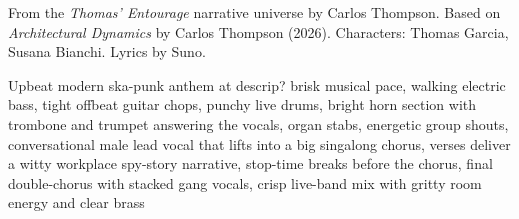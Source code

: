 
\begin{notes}
From the \emph{Thomas’ Entourage} narrative universe by Carlos Thompson. Based on \emph{Architectural Dynamics} by Carlos Thompson (2026). Characters: Thomas Garcia, Susana Bianchi. Lyrics by Suno.
\end{notes}
\begin{style}
Upbeat modern ska-punk anthem at  descrip? brisk  musical pace, walking electric bass, tight offbeat guitar chops, punchy live drums, bright horn section with trombone and trumpet answering the vocals, organ stabs, energetic group shouts, conversational male lead vocal that lifts into a big singalong chorus, verses deliver a witty workplace spy-story narrative, stop-time breaks before the chorus, final double-chorus with stacked gang vocals, crisp live-band mix with gritty room energy and clear brass
\end{style}
